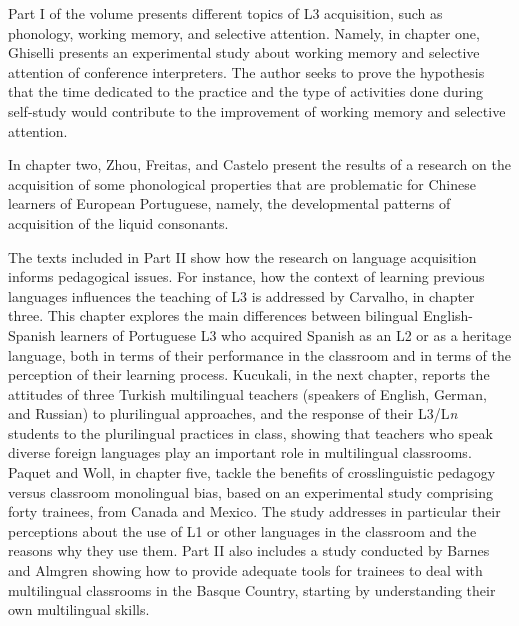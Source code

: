 \documentclass[output=paper]{langsci/langscibook}
\begin{document}
Part I of the volume presents different topics of L3 acquisition, such as phonology, working memory, and selective attention. Namely, in chapter one, Ghiselli presents an experimental study about working memory and selective attention of conference interpreters. The author seeks to prove the hypothesis that the time dedicated to the practice and the type of activities done during self-study would contribute to the improvement of working memory and selective attention.

In chapter two, Zhou, Freitas, and Castelo present the results of a research on the acquisition of some phonological properties that are problematic for Chinese learners of European Portuguese, namely, the developmental patterns of acquisition of the liquid consonants.

The texts included in Part II show how the research on language acquisition informs pedagogical issues. For instance, how the context of learning previous languages influences the teaching of L3 is addressed by Carvalho, in chapter three. This chapter explores the main differences between bilingual English-Spanish learners of Portuguese L3 who acquired Spanish as an L2 or as a heritage language, both in terms of their performance in the classroom and in terms of the perception of their learning process. Kucukali, in the next chapter, reports the attitudes of three Turkish multilingual teachers (speakers of English, German, and Russian) to plurilingual approaches, and the response of their L3/L\textit{n} students to the plurilingual practices in class, showing that teachers who speak diverse foreign languages play an important role in multilingual classrooms. Paquet and Woll, in chapter five, tackle the benefits of crosslinguistic pedagogy versus classroom monolingual bias, based on an experimental study comprising forty trainees, from Canada and Mexico. The study addresses in particular their perceptions about the use of L1 or other languages in the classroom and the reasons why they use them. Part II also includes a study conducted by Barnes and Almgren showing how to provide adequate tools for trainees to deal with multilingual classrooms in the Basque Country, starting by understanding their own multilingual skills.
\end{document}
